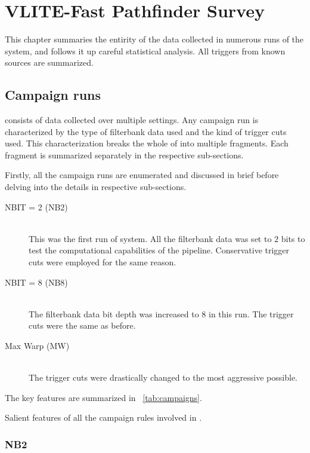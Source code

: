 \chapter{VLITE-Fast Pathfinder Survey}
\label{ch:data}

\par This chapter summaries the entirity of the data collected in numerous runs of the \vf system, and follows it up careful statistical analysis. All triggers from known sources are summarized.


\section {Campaign runs}

\par \vfpfs consists of data collected over multiple settings. 
Any campaign run is characterized by the type of filterbank data used and the kind of trigger cuts used. This characterization breaks the whole of \vfpfs into multiple fragments. Each fragment is summarized separately in the respective sub-sections. 

\par Firstly, all the campaign runs are enumerated and discussed in brief before delving into the details in respective sub-sections.
\begin{description}
	\item[NBIT = 2 (NB2)] \\
		This was the first run of \vfpfs system. All the filterbank data was set to $2$ bits to test the computational capabilities of the pipeline. Conservative trigger cuts were employed for the same reason.
	\item[NBIT = 8 (NB8)] \\
		The filterbank data bit depth was increased to $8$ in this run. The trigger cuts were the same as before.
	\item[Max Warp (MW)] \\
		The trigger cuts were drastically changed to the most aggressive possible. 
\end{description}

The key features are summarized in ~\autoref{tab:campaigns}.

\begin{table}
	\caption{Salient features of all the campaign rules involved in \vfpfs.}
	\label{tab:campaigns}
\end{table}

\subsection {NB2}

